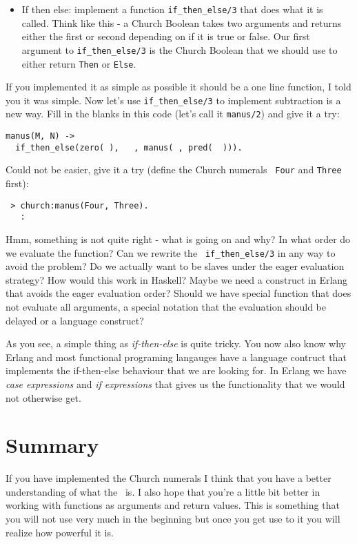 \documentclass[a4paper,11pt]{article}
\begin{document}
\begin{itemize}
\item If then else: implement a function {\tt if_then_else/3} that
  does what it is called. Think like this - a Church Boolean takes two
  arguments and returns either the first or second depending on if it
  is true or false. Our first argument to {\tt if_then_else/3} is the
  Church Boolean that we should use to either return {\tt Then} or {\tt Else}. 
\end{itemize}

If you implemented it as simple as possible it should be a one line
function, I told you it was simple. Now let's use {\tt if_then_else/3}
to implement subtraction is a new way. Fill in the blanks in this code
(let's call it {\tt manus/2}) and give it a try:

\begin{verbatim}
manus(M, N) -> 
  if_then_else(zero( ),   , manus( , pred(  ))).
\end{verbatim}

Could not be easier, give it a try (define the Church numerals {\tt
  Four} and {\tt Three} first):

\begin{verbatim}
 > church:manus(Four, Three).
   :
\end{verbatim}

Hmm, something is not quite right - what is going on and why? In what
order do we evaluate the function?  Can we rewrite the {\tt
  if_then_else/3} in any way to avoid the problem? Do we actually want
to be slaves under the eager evaluation strategy? How would this work
in Haskell?  Maybe we need a construct in Erlang that avoids the eager
evaluation order? Should we have special function that does not
evaluate all arguments, a special notation that the evaluation should
be delayed or a language construct?

As you see, a simple thing as {\em if-then-else} is quite tricky. You
now also know why Erlang and most functional programing langauges have
a language contruct that implements the if-then-else behaviour that we
are looking for. In Erlang we have {\em case expressions} and {\em if
  expressions} that gives us the functionality that we would not
otherwise get.

\section{Summary}

If you have implemented the Church numerals I think that you have a
better understanding of what the \lamc\ is. I also hope that you're a
little bit better in working with functions as arguments and return
values. This is something that you will not use very much in the
beginning but once you get use to it you will realize how powerful it
is.
\end{document}
